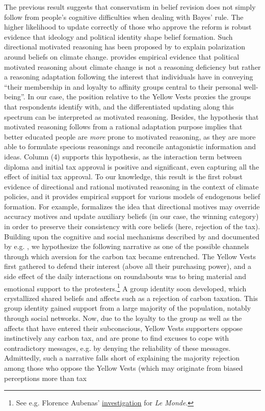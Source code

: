 \documentclass[11pt]{article}
\begin{document}
The previous result suggests that conservatism in belief revision does not simply follow from people's cognitive difficulties when dealing with Bayes' rule. The higher likelihood to update correctly of those who approve the reform is robust evidence that ideology and political identity shape belief formation. Such directional motivated reasoning has been proposed by \citet{druckman_evidence_2019} to explain polarization around beliefs on climate change. \citet{kahan_ideology_2013} provides empirical evidence that political motivated reasoning about climate change is not a reasoning deficiency but rather a reasoning adaptation following the interest that individuals have in conveying ``their membership in and loyalty to affinity groups central to their personal well-being''. In our case, the position relative to the Yellow Vests proxies the groups that respondents identify with, and the differentiated updating along this spectrum can be interpreted as motivated reasoning. Besides, the hypothesis that motivated reasoning follows from a rational adaptation purpose implies that better educated people are \textit{more} prone to motivated reasoning, as they are more able to formulate specious reasonings and reconcile antagonistic information and ideas. Column (4) supports this hypothesis, as the interaction term between diploma and initial tax approval is positive and significant, even capturing all the effect of initial tax approval. To our knowledge, this result is the first robust evidence of directional and rational motivated reasoning in the context of climate policies, and it provides empirical support for various models of endogenous belief formation. For example, \citet{little_distortion_2019} formalizes the idea that directional motives may override accuracy motives and update auxiliary beliefs (in our case, the winning category) in order to preserve their consistency with core beliefs (here, rejection of the tax). Building upon the cognitive and social mechanisms described by \citet{kraft_why_2015} and documented by e.g. \citet{redlawsk_hot_2002}, we hypothesize the following narrative as one of the possible channels through which aversion for the carbon tax became entrenched. The Yellow Vests first gathered to defend their interest (above all their purchasing power), and a side effect of the daily interactions on roundabouts was to bring material and emotional support to the protesters.\footnote{See e.g. Florence Aubenas' \href{https://www.lemonde.fr/societe/article/2018/12/15/sur-les-ronds-points-les-gilets-jaunes-a-la-croisee-des-chemins_5397928_3224.html}{investigation} for \textit{Le Monde}.} A group identity soon developed, which crystallized shared beliefs and affects such as a rejection of carbon taxation. This group identity gained support from a large majority of the population, notably through social networks. Now, due to the loyalty to the group as well as the affects that have entered their subconscious, Yellow Vests supporters oppose instinctively any carbon tax, and are prone to find excuses to cope with contradictory messages, e.g. by denying the reliability of these messages. Admittedly, such a narrative falls short of explaining the majority rejection among those who oppose the Yellow Vests (which may originate from biased perceptions more than tax 
\end{document}
